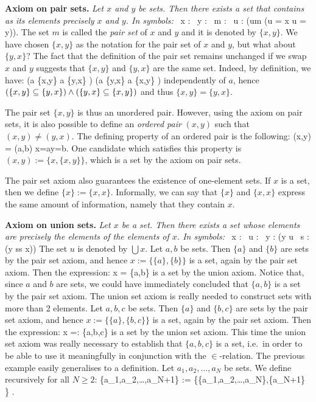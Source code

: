\textbf{Axiom on pair sets.} \emph{Let $x$ and $y$ be sets. Then there exists a set that contains as its elements precisely $x$ and $y$. In symbols:}
\bse
\forall \, x : \forall \, y : \exists \, m : \forall \, u : (u\in m \eqv (u = x \lor u = y)).
\ese
The set $m$ is called the \emph{pair set} of $x$ and $y$ and it is denoted by $\{x,y\}$.
\br
We have chosen $\{x,y\}$ as the notation for the pair set of $x$ and $y$, but what about $\{y,x\}$?
The fact that the definition of the pair set remains unchanged if we swap $x$ and $y$ suggests that $\{x,y\}$ and $\{y,x\}$ are the same set.
Indeed, by definition, we have:
\bse
(a \in \{x,y\} \imp a \in \{y,x\} ) \land (a \in \{y,x\} \imp a \in \{x,y\} ) 
\ese
independently of $a$, hence $(\{x,y\} \subseteq \{y,x\}) \land (\{y,x\} \subseteq \{x,y\})$ and thus $\{x,y\} = \{y,x\}$.
\er

The pair set $\{x,y\}$ is thus an unordered pair. However, using the axiom on pair sets, it is also possible to define an \emph{ordered pair} $(x,y)$ such that $(x,y)\neq(y,x)$. The defining property of an ordered pair is the following:
\bse
(x,y) = (a,b) \eqv x=a\land y=b.
\ese
One candidate which satisfies this property is $(x,y):=\{x,\{x,y\}\}$, which is a set by the axiom on pair sets.

\br
The pair set axiom also guarantees the existence of one-element sets. 
If $x$ is a set, then we define $\{x\}:=\{x,x\}$. Informally, we can say that $\{x\}$ and $\{x,x\}$ express the same amount of information, namely that they contain $x$. 
\er

\textbf{Axiom on union sets.} \emph{Let $x$ be a set. Then there exists a set whose elements are precisely the elements of the elements of $x$. In symbols:}
\bse
\forall \, x : \exists \, u : \forall \, y : (y \in u \eqv \exists \, s :(y \in s\land s \in x))
\ese
The set $u$ is denoted by $\bigcup x$.
\be
Let $a,b$ be sets. Then $\{a\}$ and $\{b\}$ are sets by the pair set axiom, and hence $x:=\{\{a\},\{b\}\}$ is a set, again by the pair set axiom. Then the expression:
\bse
\bigcup x = \{a,b\}
\ese
is a set by the union axiom.
\ee
Notice that, since $a$ and $b$ are sets, we could have immediately concluded that $\{a,b\}$ is a set by the pair set axiom. The union set axiom is really needed to construct sets with more than 2 elements.
\be
Let $a,b,c$ be sets. Then $\{a\}$ and $\{b,c\}$ are sets by the pair set axiom, and hence $x:=\{\{a\},\{b,c\}\}$ is a set, again by the pair set axiom. Then the expression:
\bse
\bigcup x =: \{a,b,c\}
\ese
is a set by the union set axiom. This time the union set axiom was really necessary to establish that $\{a,b,c\}$ is a set, i.e.\ in order to be able to use it meaningfully in conjunction with the $\in$-relation.
\ee
The previous example easily generalises to a definition.
\bd
Let $a_1,a_2,\ldots,a_N$ be sets. We define recursively for all $N\geq 2$:
\bse
\{a_1,a_2,\ldots,a_{N+1}\} := \bigcup \left\{\{a_1,a_2,\ldots,a_{N}\},\{a_{N+1}\} \right\} .
\ese
\ed

